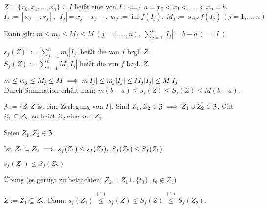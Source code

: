 \documentclass[a4paper,twoside,DIV15,BCOR12mm]{scrbook}
\begin{document}
\def\Z{\ensuremath{\mathfrak{Z}}}

\begin{definition}
$Z = \{x_0,x_1,\ldots,x_n\} \subseteq I$ heißt eine  von $I :\iff a = x_0 < x_1 < \ldots < x_n = b.$\\
$I_j := [x_{j-1};x_j],\ |I_j| = x_j-x_{j-1},\ m_j := \inf f(I_j),\ M_j := \sup f(I_j)\ (j = 1,\ldots,n)$

Dann gilt: $m \le m_j \le M_j \le M\ (j = 1,\ldots,n),\ \sum_{j=1}^{n}{|I_j|} = b-a\ (=|I|)$
\begin{tabbing}
$s_f(Z) $ \=$:= \sum_{j=1}^{n}{m_j |I_j|}$ \=heißt die  von $f$ bzgl. $Z$.\\
$S_f(Z) $\>$:= \sum_{j=1}^{n}{M_j |I_j|}$ \>heißt die  von $f$ bzgl. $Z$.
\end{tabbing}

$m \le m_j \le M_j \le M \implies m|I_j| \le m_j|I_j| \le M_j|I_j| \le M|I_j|$\\
Durch Summation erhält man: $m(b-a) \le s_f(Z) \le S_f(Z) \le M(b-a)$.

$\Z := \{Z: Z$ ist eine Zerlegung von $I\}.$ Sind $Z_1,Z_2 \in \Z \folgt Z_1 \cup Z_2 \in \Z$. Gilt $Z_1 \subseteq Z_2$, so heißt $Z_2$ eine  von $Z_1$.
\end{definition}

\begin{satz}
Seien $Z_1,Z_2 \in \Z$.
\begin{liste}
\item Ist $Z_1 \subseteq Z_2 \implies s_f(Z_1) \le s_f(Z_2),\ S_f(Z_2) \le S_f(Z_1)$
\item $s_f(Z_1) \le S_f(Z_2)$
\end{liste}
\end{satz}

\begin{beweise}
\item Übung (es genügt zu betrachten: $Z_2 = Z_1 \cup \{t_0\},\ t_0 \notin Z_1$)
\item $Z := Z_1 \subseteq Z_2$. Dann: $s_f(Z_1) \overset{(1)}{\le} s_f(Z) \le S_f(Z) \overset{(1)}{\le} S_f(Z_2).$
\end{beweise}

\def\dx{\text{d}x}
\def\dt{\text{d}t}
\def\uint{\declareslashed{}{\text{-}}{0}{-.7}{\int} \ensuremath{\slashed{\int}}}
\def\oint{\declareslashed{}{\text{-}}{.15}{.7}{\int} \ensuremath{\slashed{\int}}}
\end{document}
